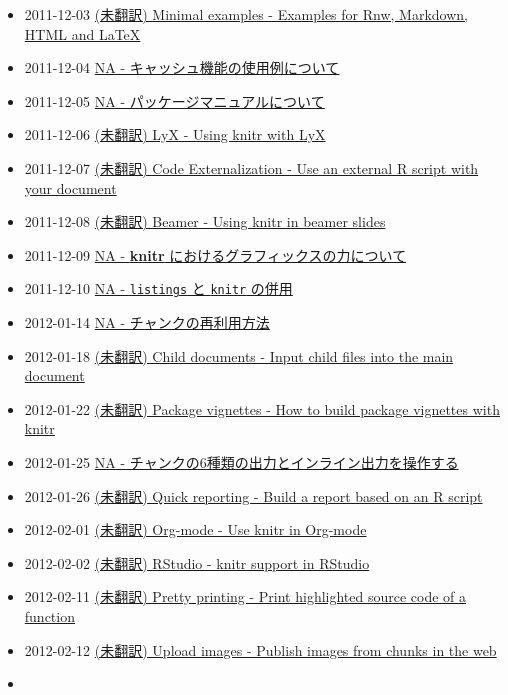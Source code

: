 \documentclass[
  lualatex,ja=standard,jafont=noto-otf]{bxjsreport}
\providecommand{\tightlist}{%
  \setlength{\itemsep}{0pt}\setlength{\parskip}{0pt}}
\begin{document}
\begin{itemize}
\tightlist
\item
  2011-12-03 \href{https://yihui.org/knitr/demo/minimal}{(未翻訳)
  Minimal examples - Examples for Rnw, Markdown, HTML and LaTeX}
\item
  2011-12-04 \href{NA}{NA - キャッシュ機能の使用例について}
\item
  2011-12-05 \href{NA}{NA - パッケージマニュアルについて}
\item
  2011-12-06 \href{https://yihui.org/knitr/demo/lyx}{(未翻訳) LyX -
  Using knitr with LyX}
\item
  2011-12-07
  \href{https://yihui.org/knitr/demo/externalization}{(未翻訳) Code
  Externalization - Use an external R script with your document}
\item
  2011-12-08 \href{https://yihui.org/knitr/demo/beamer}{(未翻訳) Beamer
  - Using knitr in beamer slides}
\item
  2011-12-09 \href{NA}{NA - \textbf{knitr}
  におけるグラフィックスの力について}
\item
  2011-12-10 \href{NA}{NA - \texttt{listings} と \texttt{knitr} の併用}
\item
  2012-01-14 \href{NA}{NA - チャンクの再利用方法}
\item
  2012-01-18 \href{https://yihui.org/knitr/demo/child}{(未翻訳) Child
  documents - Input child files into the main document}
\item
  2012-01-22 \href{https://yihui.org/knitr/demo/vignette}{(未翻訳)
  Package vignettes - How to build package vignettes with knitr}
\item
  2012-01-25 \href{NA}{NA -
  チャンクの6種類の出力とインライン出力を操作する}
\item
  2012-01-26 \href{https://yihui.org/knitr/demo/stitch}{(未翻訳) Quick
  reporting - Build a report based on an R script}
\item
  2012-02-01 \href{https://yihui.org/knitr/demo/org}{(未翻訳) Org-mode -
  Use knitr in Org-mode}
\item
  2012-02-02 \href{https://yihui.org/knitr/demo/rstudio}{(未翻訳)
  RStudio - knitr support in RStudio}
\item
  2012-02-11 \href{https://yihui.org/knitr/demo/pretty}{(未翻訳) Pretty
  printing - Print highlighted source code of a function}
\item
  2012-02-12 \href{https://yihui.org/knitr/demo/upload}{(未翻訳) Upload
  images - Publish images from chunks in the web}
\item

\end{itemize}
\end{document}
